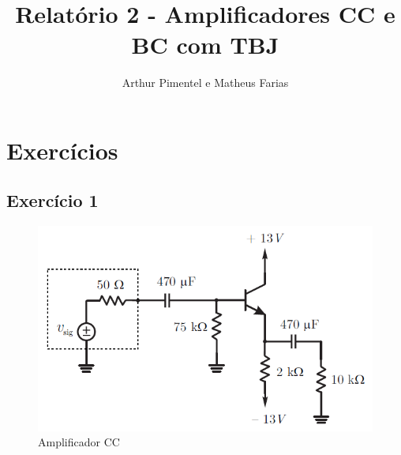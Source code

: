 \documentclass[journal, a4paper]{IEEEtran}
\begin{document}
	\title{Relatório 2 - Amplificadores CC e BC com TBJ}
	\author{Arthur Pimentel e Matheus Farias}
	\maketitle

    \section{Exercícios}
    	   
        \subsection{Exercício 1}    
            \begin{figure}[H]
        		\begin{center}
        		\includegraphics[width=\columnwidth]{CIRCUITO1.png}
        		\caption{Amplificador CC}
        		\label{circuito1}
        		\end{center}
        	\end{figure}
            
\end{document}
